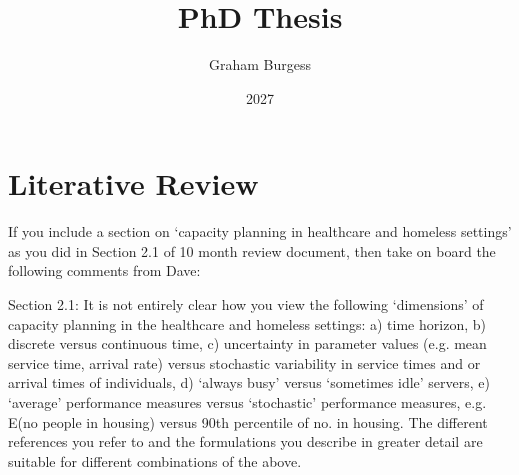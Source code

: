 \documentclass[12pt,a4paper]{article}
\title{PhD Thesis}
\author{Graham Burgess}
\date{2027}
\begin{document}
%
\maketitle

\section{Literative Review}

If you include a section on `capacity planning in healthcare and homeless settings' as you did in Section 2.1 of 10 month review document, then take on board the following comments from Dave:

Section 2.1:
It is not entirely clear how you view the following ‘dimensions’ of capacity planning in the healthcare and homeless settings: 
a)	time horizon,
b)	discrete versus continuous time, 
c)	uncertainty in parameter values (e.g. mean service time, arrival rate) versus stochastic variability in service times and or arrival times of individuals,
d)	‘always busy’ versus ‘sometimes idle’ servers,
e)	‘average’ performance measures versus ‘stochastic’ performance measures, e.g. E(no people in housing) versus 90th percentile of no. in housing.  
The different references you refer to and the formulations you describe in greater detail are suitable for different combinations of the above.
\end{document}
